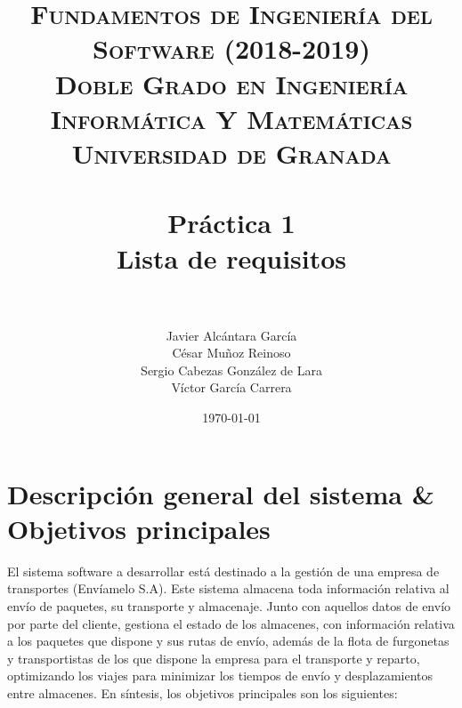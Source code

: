 



\title{	
\normalfont \normalsize 
\textsc{\textbf{Fundamentos de Ingeniería del Software (2018-2019)} \\ Doble Grado en Ingeniería Informática Y Matemáticas \\ Universidad de Granada} \\ [25pt] %
\horrule{0.5pt} \\[0.4cm] %
\huge \textbf{Práctica 1} \\ Lista de requisitos \\ %
\horrule{2pt} \\[0.5cm] %
}

\author{Javier Alcántara García\\ César Muñoz Reinoso \\ Sergio Cabezas González de Lara \\ Víctor García Carrera} %

\date{\normalsize\today} %





\maketitle %

\newpage %

\tableofcontents %

\newpage


\section{Descripción general del sistema \& Objetivos principales}
El sistema software a desarrollar está destinado a la gestión de una empresa de transportes (Envíamelo S.A). Este sistema almacena toda información relativa al envío de paquetes, su transporte y almacenaje. Junto con aquellos datos de envío por parte del cliente, gestiona el estado de los almacenes, con información relativa a los paquetes que dispone y sus rutas de envío, además de la flota de furgonetas y transportistas de los que dispone la empresa para el transporte y reparto, optimizando los viajes para minimizar los tiempos de envío y desplazamientos entre almacenes.
En síntesis, los objetivos principales son los siguientes:

